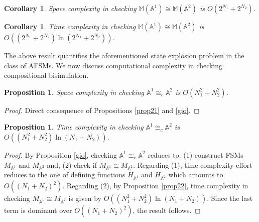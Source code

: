 \documentclass{amsart}
\newtheorem{proposition}[theorem]{Proposition}
\newtheorem{corollary}[theorem]{Corollary}
\theoremstyle{definition}
\theoremstyle{remark}
\numberwithin{equation}{section}
\begin{document}
\begin{corollary}
\label{prop23}
Space complexity in checking $\mathbb{M}(\mathbb{A}^{1})\cong \mathbb{M}(\mathbb{A}^{2})$ is $O(2^{N_{1}}+2^{N_{2}})$.
\end{corollary}

\begin{corollary}
\label{prop24}
Time complexity in checking $\mathbb{M}(\mathbb{A}^{1})\cong \mathbb{M}(\mathbb{A}^{2})$ is $O((2^{N_{1}}+2^{N_{2}})\ln(2^{N_{1}}+2^{N_{2}}))$. 
\end{corollary}

The above result quantifies the aforementioned state explosion problem \cite{StateExplosion2,StateExplosion1} in the class of AFSMs. We now discuss computational complexity in checking compositional bisimulation. 
\begin{proposition}
\label{prop25}
Space complexity in checking $\mathbb{A}^{1}\cong_{c}\mathbb{A}^{2}$ is $O(N_{1}^{2}+N_{2}^{2})$.
\end{proposition}

\begin{proof}
Direct consequence of Propositions \ref{prop21} and \ref{gio}. 
\end{proof}

\begin{proposition}
\label{prop26}
Time complexity in checking $\mathbb{A}^{1}\cong_{c} \mathbb{A}^{2}$ is $O((N_{1}^{2}+N_{2}^{2})\ln(N_{1}+N_{2}))$. 
\end{proposition}
\begin{proof}
By Proposition \ref{gio}, checking $\mathbb{A}^{1}\cong_{c} \mathbb{A}^{2}$ reduces to: (1) construct FSMs $M_{\mathbb{A}^{1}}$ and $M_{\mathbb{A}^{2}}$ and, (2) check if $M_{\mathbb{A}^{1}}\cong M_{\mathbb{A}^{2}}$. 
Regarding (1), time complexity effort reduces to the one of defining functions $H_{\mathbb{A}^{1}}$ and $H_{\mathbb{A}^{2}}$ which amounts to 
$O((N_{1}+N_{2})^{2})$. 
Regarding (2), by Proposition \ref{prop22}, time complexity in checking $M_{\mathbb{A}^{1}} \cong M_{\mathbb{A}^{2}}$ is given by $
O((N_{1}^{2}+N_{2}^{2})\ln(N_{1}+N_{2}))$.
Since the last term is dominant over $O((N_{1}+N_{2})^{2})$, the result follows. 
\end{proof}
\end{document}
